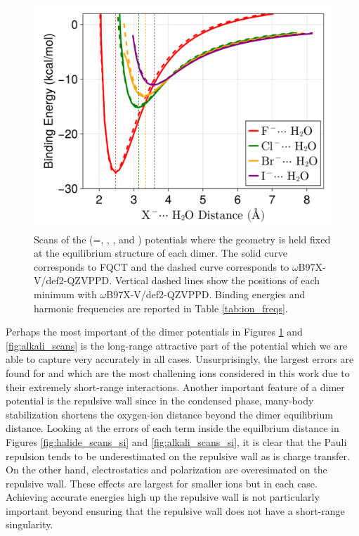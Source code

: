 \documentclass[journal=jacsat,manuscript=article]{achemso}
\begin{document}
\begin{figure}[h]
  \includegraphics*[width=\textwidth]{figures/anion_dimer_scans.png}
  \caption{Scans of the  (=, , , and )
  potentials where the geometry is held fixed at the equilibrium structure of each dimer.
  The solid curve corresponds to FQCT and the dashed curve corresponds to $\omega$B97X-V/def2-QZVPPD.
  Vertical dashed lines show the positions of each minimum with $\omega$B97X-V/def2-QZVPPD.
  Binding energies and harmonic frequencies are reported in Table \ref{tab:ion_freqs}.
  }\label{fig:halide_scans}
\end{figure}

Perhaps the most important of the dimer potentials in Figures \ref{fig:halide_scans} and \ref{fig:alkali_scans}
is the long-range attractive part of the potential which we are able to capture very accurately in
all cases. Unsurprisingly, the largest errors are found for  and  which are the
most challening ions considered in this work due to their extremely short-range interactions.
Another important feature of a dimer potential is the repulsive wall since in the condensed phase,
many-body stabilization shortens the oxygen-ion distance beyond the dimer equilibrium distance.
Looking at the errors of each term inside the equilbrium distance in Figures \ref{fig:halide_scans_si} and \ref{fig:alkali_scans_si},
it is clear that the Pauli repulsion tends to be underestimated on the repulsive wall as is charge transfer.
On the other hand, electrostatics and polarization are overesimated on the repulsive wall. These effects
are largest for smaller ions but in each case.
Achieving accurate energies high up the repulsive wall is not particularly important beyond ensuring
that the repulsive wall does not have a short-range singularity.
\end{document}

